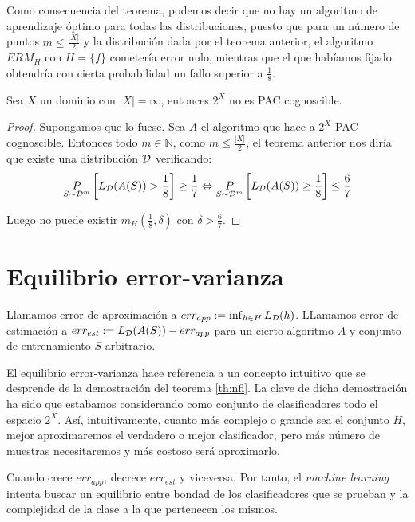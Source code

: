 Como consecuencia del teorema, podemos decir que no hay un algoritmo de aprendizaje óptimo para todas las 
distribuciones, puesto que para un número de puntos $m \le \frac{|X|}{2}$ y la distribución dada por el teorema
anterior, el algoritmo $ERM_H$ con $H = \{f\}$ cometería error nulo, mientras que el que habíamos fijado
obtendría con cierta probabilidad un fallo superior a $\frac{1}{8}$.

\begin{corollary}
 Sea $X$ un dominio con $|X| = \infty$, entonces $2^X$ no es PAC cognoscible.
 \label{cor:P(X)notpac}
\end{corollary}

\begin{proof}
 Supongamos que lo fuese. Sea $A$ el algoritmo que hace a $2^X$ PAC cognoscible. Entonces todo $m\in \mathbb{N}$, como 
 $m\le \frac{|X|}{2}$, el teorema anterior nos diría que existe una distribución $\mathcal{D}$ verificando: 
 \[
   \underset{S\sim \mathcal{D}^m}{P} \left[ L_{\mathcal{D}}(A(S)) > \frac{1}{8} \right] \ge \frac{1}{7} \Leftrightarrow 
   \underset{S\sim \mathcal{D}^m}{P} \left[ L_{\mathcal{D}}(A(S)) \ge \frac{1}{8} \right] \le \frac{6}{7} 
 \]
 
 Luego no puede existir $m_H \left(\frac{1}{8}, \delta\right)$ con $\delta > \frac{6}{7}$.
\end{proof}


\section{Equilibrio error-varianza}
\begin{definition}
 Llamamos error de aproximación a $err_{app} := \inf_{h\in H} L_{\mathcal{D}}(h)$. LLamamos error de estimación a $err_{est} := 
 L_{\mathcal{D}} (A(S)) - err_{app}$ para un cierto algoritmo $A$ y conjunto de entrenamiento $S$ arbitrario.
\end{definition}

El equilibrio error-varianza hace referencia a un concepto intuitivo que se desprende de la demostración del teorema
\ref{th:nfl}. La clave de dicha demostración ha sido que estabamos considerando
como conjunto de clasificadores todo el espacio $2^X$. Así, intuitivamente, cuanto más complejo o grande sea el conjunto 
$H$, mejor aproximaremos el verdadero o mejor clasificador, pero más número de muestras necesitaremos y más costoso será
aproximarlo.

Cuando crece $err_{app}$, decrece $err_{est}$ y viceversa. Por tanto, el \emph{machine learning} intenta buscar un equilibrio
entre bondad de los clasificadores que se prueban y la complejidad de la clase a la que pertenecen los mismos.
